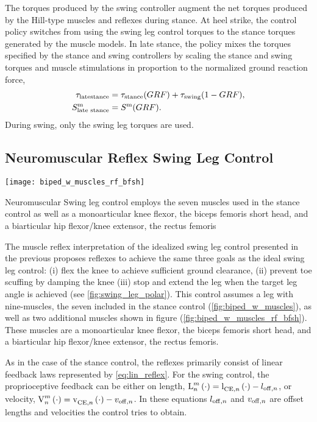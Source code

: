 The torques produced by the swing controller augment the net torques produced by
the Hill-type muscles and reflexes during stance. At heel strike, the control
policy switches from using the swing leg control torques to the stance torques
generated by the muscle models. In late stance, the policy mixes the torques
specified by the stance and swing controllers by scaling the stance and swing
torques and muscle stimulations in proportion to the normalized ground reaction
force,
\begin{align}
    \tau_{\mathrm{late stance}} &= \tau_{\mathrm{stance}}(GRF) +
    \tau_{\mathrm{swing}}(1 - GRF), \label{eq:stance_grf_trans}\\ 
    S^{\mathrm{m}}_\textrm{late stance}  &= S^{\mathrm{m}}(GRF).\label{eq:swing_grf_trans}
\end{align}
During swing, only the swing leg torques are used.

\subsection{Neuromuscular Reflex Swing Leg Control}\label{sec:neuro_muscle_swing}
\begin{marginfigure}[3in]
    \centering
    \texttt{[image: biped\_w\_muscles\_rf\_bfsh]}
    \caption{Neuromuscular Swing leg control employs the seven muscles used in
    the stance control as well as a monoarticular knee flexor, the biceps
    femoris short head, and a biarticular hip flexor/knee extensor, the rectus
    femoris} 
    \label{fig:biped_w_muscles_rf_bfsh}
\end{marginfigure} 

The muscle reflex interpretation of the idealized swing leg control presented in
the previous  proposes reflexes to achieve
the same three goals as the ideal swing leg control: (i) flex the knee to
achieve sufficient ground clearance, (ii) prevent toe scuffing by damping the
knee (iii) stop and extend the leg when the target leg angle is achieved (see
\cref{fig:swing_leg_polar}). This control assumes a leg with nine-muscles, the
seven included in the stance control (\cref{fig:biped_w_muscles}), as well as
two additional muscles shown in figure (\cref{fig:biped_w_muscles_rf_bfsh}).
These muscles are a monoarticular knee flexor, the biceps femoris short head,
and a biarticular hip flexor/knee extensor, the rectus femoris. 

As in the case of the stance control, the reflexes primarily consist of linear
feedback laws represented by \cref{eq:lin_reflex}. For the swing control, the
proprioceptive feedback can be either on length, $\func{L}[n][m]{\cdot} =
\func{l}[\tn{CE},n][]{\cdot} - l_{\tn{off}, n}$, or velocity,
$\func{V}[n][m]{\cdot} = \func{v}[\tn{CE},n][]{\cdot} - v_{\tn{off}, n}$. In
these equations $l_{\mathrm{off},n}$ and $v_{\mathrm{off}, n}$ are offset lengths and
velocities the control tries to obtain.

